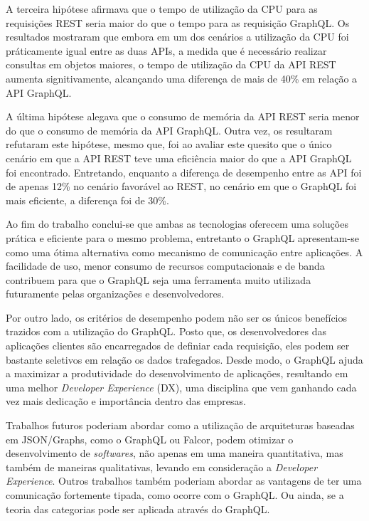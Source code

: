 A terceira hipótese afirmava que o tempo de utilização da CPU para as requisições REST seria maior do que o tempo para as requisição GraphQL. Os resultados mostraram que embora em um dos cenários a utilização da CPU foi práticamente igual entre as duas APIs, a medida que é necessário realizar consultas em objetos maiores, o tempo de utilização da CPU da API REST aumenta signitivamente, alcançando uma diferença de mais de 40\% em relação a API GraphQL.

A última hipótese alegava que o consumo de memória da API REST seria menor do que o consumo de memória da API GraphQL. Outra vez, os resultaram refutaram este hipótese, mesmo que, foi ao avaliar este quesito que o único cenário em que a API REST teve uma eficiência maior do que a API GraphQL foi encontrado. Entretando, enquanto a diferença de desempenho entre as API foi de apenas 12\% no cenário favorável ao REST, no cenário em que o GraphQL foi mais eficiente, a diferença foi de 30\%. 

Ao fim do trabalho conclui-se que ambas as tecnologias oferecem uma soluções prática e eficiente para o mesmo problema, entretanto o GraphQL apresentam-se como uma ótima alternativa como mecanismo de comunicação entre aplicações. A facilidade de uso, menor consumo de recursos computacionais e de banda contribuem para que o GraphQL seja uma ferramenta muito utilizada futuramente pelas organizações e desenvolvedores. 

Por outro lado, os critérios de desempenho podem não ser os únicos benefícios trazidos com a utilização do GraphQL. Posto que, os desenvolvedores das aplicações clientes são encarregados de definiar cada requisição, eles podem ser bastante seletivos em relação os dados trafegados. Desde modo, o GraphQL ajuda a maximizar a produtividade do desenvolvimento de aplicações, resultando em uma melhor \textit{Developer Experience} (DX), uma disciplina que vem ganhando cada vez mais dedicação e importância dentro das empresas.

Trabalhos futuros poderiam abordar como a utilização de arquiteturas baseadas em JSON/Graphs, como o GraphQL ou Falcor, podem otimizar o desenvolvimento de \textit{softwares}, não apenas em uma maneira quantitativa, mas também de maneiras qualitativas, levando em consideração a \textit{Developer Experience}. Outros trabalhos também poderiam abordar as vantagens de ter uma comunicação fortemente tipada, como ocorre com o GraphQL. Ou ainda, se a teoria das categorias pode ser aplicada através do GraphQL.
